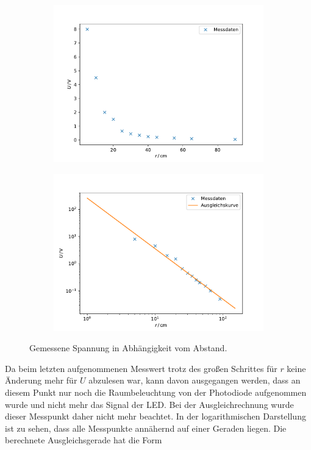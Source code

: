 \begin{figure}[h]
\begin{subfigure}{0.45\textwidth}
    \centering
    \includegraphics[width=\textwidth]{assets/plot_3.pdf}
\end{subfigure}
\begin{subfigure}{0.45\textwidth}
    \centering
    \includegraphics[width=\textwidth]{assets/plot_4.pdf}
\end{subfigure}
\caption{Gemessene Spannung in Abhängigkeit vom Abstand.}
\label{fig:LED}
\end{figure}
Da beim letzten aufgenommenen Messwert trotz des großen Schrittes für $r$ keine Änderung mehr für $U$ abzulesen war, kann davon ausgegangen werden, dass an diesem Punkt nur noch die Raumbeleuchtung von der Photodiode aufgenommen wurde und nicht mehr das Signal der LED. Bei der Ausgleichrechnung wurde dieser Messpunkt daher nicht mehr beachtet. In der logarithmischen Darstellung ist zu sehen, dass alle Messpunkte annähernd auf einer Geraden liegen. Die berechnete Ausgleichsgerade hat die Form
